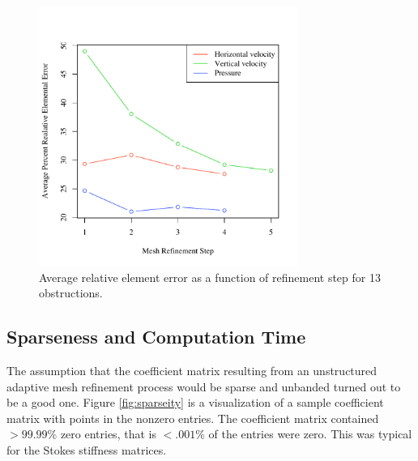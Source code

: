 \documentclass[wrr]{agutex}  %
\begin{document}
\begin{article}
\begin{figure}
\noindent\includegraphics[width=20pc]{../plots/errorstep_13.pdf}
\caption{Average relative element error as a function of refinement step for 13 obstructions.}\label{fig:err_13}
\end{figure}



\subsection{Sparseness and Computation Time}
The assumption that the coefficient matrix resulting from an unstructured adaptive mesh refinement process would be sparse and unbanded turned out to be a good one.  Figure \ref{fig:sparseity} is a visualization of a sample coefficient matrix with points in the nonzero entries.  The coefficient matrix contained $>99.99$\% zero entries, that is $<.001$\% of the entries were zero.  This was typical for the Stokes stiffness matrices. 


\end{article}
\end{document}
